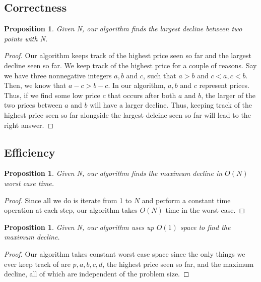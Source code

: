 \documentclass[12pt]{article}
\newtheorem{proposition}[theorem]{Proposition}
\begin{document}
\newpage

\subsection{Correctness}

\begin{proposition}
    Given N, our algorithm finds the largest decline between
    two points with N.
\end{proposition}

\begin{proof}
    Our algorithm keeps track of the highest price seen so far
    and the largest decline seen so far. We keep track of the
    highest price for a couple of reasons. Say we have three
    nonnegative integers $a, b$ and $c$, such that $a > b$ and
    $c < a, c < b$. Then, we know that $a - c > b - c$. In our
    algorithm, $a, b$ and $c$ represent prices. Thus, if we find
    some low price $c$ that occurs after both $a$ and $b$, the larger
    of the two prices between $a$ and $b$ will have a larger decline.
    Thus, keeping track of the highest price seen so far alongside the
    largest delcine seen so far will lead to the right answer.
\end{proof}

\subsection{Efficiency}

\begin{proposition}
    Given N, our algorithm finds the maximum decline in $O(N)$
    worst case time.
\end{proposition}

\begin{proof}
    Since all we do is iterate from 1 to $N$ and perform a constant
    time operation at each step, our algorithm takes $O(N)$ time
    in the worst case.
\end{proof}

\begin{proposition}
    Given N, our algorithm uses up $O(1)$ space to find the maximum
    decline.
\end{proposition}

\begin{proof}
    Our algorithm takes constant worst case space since the only
    things we ever keep track of are $p, a, b, c, d$, the highest
    price seen so far, and the maximum decline, all of which are
    independent of the problem size.
\end{proof}
\end{document}
